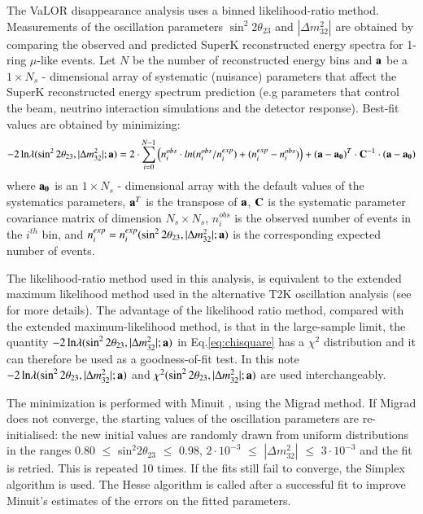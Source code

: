The VaLOR disappearance analysis uses a binned likelihood-ratio method.
Measurements of the oscillation parameters $\sin^{2}2\theta_{23}$ and $|\Delta m^{2}_{32}|$
are obtained by comparing the observed and predicted SuperK reconstructed energy spectra
for 1-ring $\mu$-like events.
Let $N$ be the number of reconstructed energy bins and
${\bf a}$ be a $1 \times N_{s}$ - dimensional array of systematic (nuisance) 
parameters that affect the SuperK reconstructed energy spectrum prediction (e.g
parameters that control the beam, neutrino interaction simulations and 
the detector response).
Best-fit values are obtained by minimizing: 
\begin{equation}
\displaystyle
-2 \, \textrm{ln} \lambda (\sin^{2}2\theta_{23},|\Delta m^{2}_{32}|; {\bf a}) = 
  2 \cdot \sum_{i=0}^{N-1} 
   \Big( 
     n^{obs}_{i} \cdot ln(n^{obs}_{i}/n^{exp}_{i}) +
     (n^{exp}_{i}-n^{obs}_{i}) 
   \Big) +
   ({\bf a}-{\bf a_{0}})^{T} \cdot {\bf C}^{-1} \cdot ({\bf a}-{\bf a_{0}})
\label{eq:chisquare}
\end{equation}
where
${\bf a_{0}}$ is an $1 \times N_{s}$ - dimensional array with the default values of 
the systematics parameters, ${\bf a}^{T}$ is the transpose of ${\bf a}$,
${\bf C}$ is the systematic parameter covariance matrix of dimension $N_{s} \times N_{s}$,
$n^{obs}_{i}$ is the observed number of events in the $i^{th}$ bin, and
$n^{exp}_{i} = n^{exp}_{i}(\sin^{2}2\theta_{23},|\Delta m^{2}_{32}|; {\bf a})$ 
is the corresponding expected number of events.

The likelihood-ratio method used in this analysis, is equivalent to the extended maximum likelihood
method used in the alternative T2K oscillation analysis 
(see \cite{OurRun1DisappAnalysis,StatAnalysisCowan} for more details).
The advantage of the likelihood ratio method, compared with the extended maximum-likelihood method, is that
in the large-sample limit, the quantity $-2 \, \textrm{ln} \lambda (\sin^{2}2\theta_{23},|\Delta m^{2}_{32}|; {\bf a})$
in Eq.\ref{eq:chisquare} has a $\chi^{2}$ distribution and it can therefore be used as a goodness-of-fit test.
In this note
$-2 \, \textrm{ln} \lambda (\sin^{2}2\theta_{23},|\Delta m^{2}_{32}|; {\bf a})$ and
$\chi^{2}(\sin^{2}2\theta_{23},|\Delta m^{2}_{32}|; {\bf a})$ are used interchangeably.

The minimization is performed with Minuit \cite{Minuit}, using the Migrad method.
If Migrad does not converge, the starting values of the oscillation parameters are re-initialised:
the new initial values are randomly drawn from uniform distributions in the ranges 
0.80 $\leq$ sin$^{2}2\theta_{23}$ $\leq$ 0.98, 
$2 \cdot 10^{-3}$ $\leq$ $|\Delta m^{2}_{32}|$ $\leq$ $3 \cdot 10^{-3}$
and the fit is retried. This is repeated 10 times.
If the fits still fail to converge, the Simplex algorithm is used.
The Hesse algorithm is called after a successful fit to improve Minuit's estimates of the
errors on the fitted parameters.

